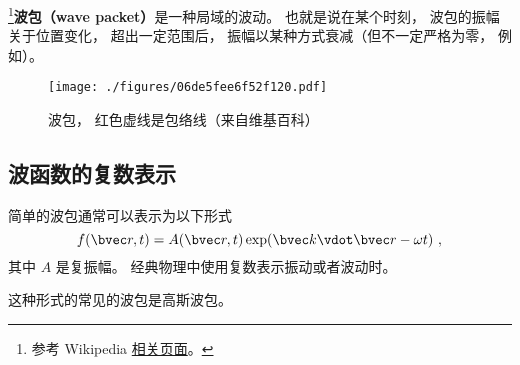 

\footnote{参考 Wikipedia \href{https://en.wikipedia.org/wiki/Wave_packet}{相关页面}。}\textbf{波包（wave packet）}是一种局域的波动。 也就是说在某个时刻， 波包的振幅关于位置变化， 超出一定范围后， 振幅以某种方式衰减（但不一定严格为零， 例如）。

\begin{figure}[ht]
\centering
\texttt{[image: ./figures/06de5fee6f52f120.pdf]}
\caption{波包， 红色虚线是包络线（来自维基百科）} \label{fig_WvPck_1}
\end{figure}

\subsection{波函数的复数表示}
简单的波包通常可以表示为以下形式
\begin{equation}
f(\bvec r, t) = A(\bvec r, t) \exp(\bvec k \vdot \bvec r - \omega t)~,
\end{equation}
其中 $A$ 是复振幅。 经典物理中使用复数表示振动或者波动时。

这种形式的常见的波包是高斯波包。
